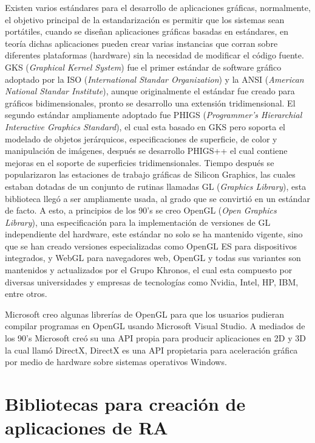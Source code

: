 \documentclass[12pt,a4paper,spanish,openany]{book}
\begin{document}
Existen varios estándares para el desarrollo de aplicaciones gráficas,
normalmente, el objetivo principal de la estandarización es permitir que los
sistemas sean portátiles, cuando se diseñan aplicaciones gráficas basadas en estándares, en
teoría dichas aplicaciones pueden crear varias instancias que corran sobre
diferentes plataformas (hardware) sin la necesidad de modificar el código
fuente. GKS (\emph{Graphical Kernel System}) fue el primer estándar de software
gráfico adoptado por la ISO (\emph{International Standar Organization}) y la
ANSI (\emph{American National Standar Institute}), aunque originalmente el estándar
fue creado para gráficos bidimensionales, pronto se desarrollo una extensión
tridimensional. El segundo estándar ampliamente adoptado fue PHIGS
(\emph{Programmer's Hierarchial Interactive Graphics Standard}), el cual esta
basado en GKS pero soporta el modelado de objetos jerárquicos, especificaciones
de superficie, de color y manipulación de imágenes, después se desarrollo
PHIGS++ el cual contiene mejoras en el soporte de superficies tridimensionales.
Tiempo  después se popularizaron  las estaciones de trabajo gráficas de
Silicon Graphics, las cuales estaban dotadas de un conjunto de rutinas llamadas
GL (\emph{Graphics Library}), esta biblioteca llegó a ser ampliamente usada, al
grado que se convirtió en un estándar de facto. A esto, a principios de
los 90's se creo OpenGL (\emph{Open Graphics Library}), una especificación para
la implementación de versiones de GL independiente del hardware, este estándar no solo se ha mantenido
vigente, sino que se han creado versiones especializadas como OpenGL ES para
dispositivos integrados, y WebGL para navegadores web, OpenGL y todas sus
variantes son mantenidos y actualizados por el Grupo Khronos, el cual esta
compuesto por diversas universidades y empresas de tecnologías como Nvidia,
Intel, HP, IBM, entre otros.

Microsoft creo algunas librerías de OpenGL para que los usuarios pudieran
compilar programas en OpenGL usando Microsoft Visual Studio. A mediados de los
90's Microsoft creó su una API propia para producir aplicaciones en 2D y 3D la
cual llamó DirectX, DirectX es una API propietaria para aceleración gráfica por
medio de hardware sobre sistemas operativos Windows.
\cite{Tan:2008:IDP:1396808.1397457}


\section{Bibliotecas para creación de aplicaciones de RA}
\end{document}
